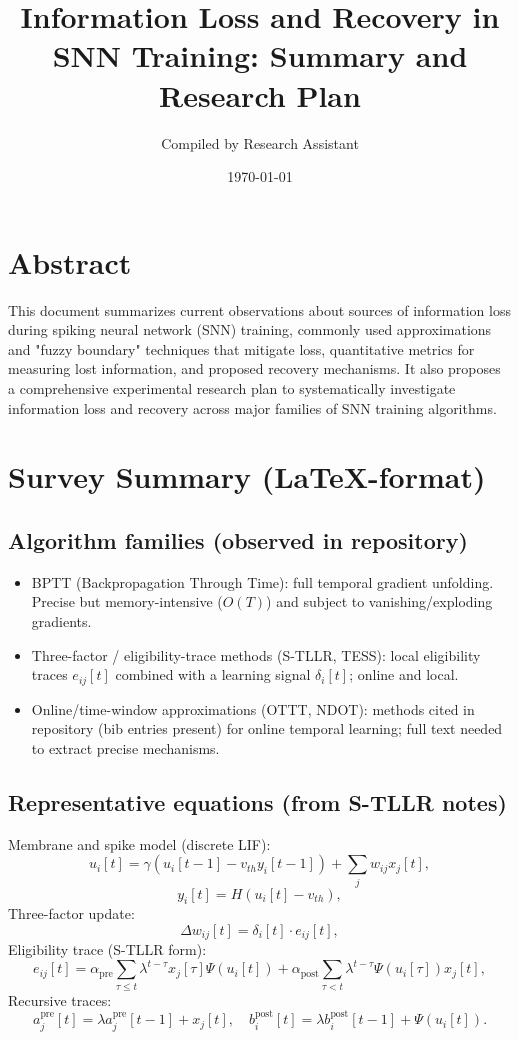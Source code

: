 \documentclass{article}
\begin{document}
\title{Information Loss and Recovery in SNN Training: Summary and Research Plan}
\author{Compiled by Research Assistant}
\date{\today}
\maketitle

\section*{Abstract}
This document summarizes current observations about sources of information loss during spiking neural network (SNN) training, commonly used approximations and "fuzzy boundary" techniques that mitigate loss, quantitative metrics for measuring lost information, and proposed recovery mechanisms. It also proposes a comprehensive experimental research plan to systematically investigate information loss and recovery across major families of SNN training algorithms.

\section{Survey Summary (LaTeX-format)}
\subsection{Algorithm families (observed in repository)}
\begin{itemize}
  \item BPTT (Backpropagation Through Time): full temporal gradient unfolding. Precise but memory-intensive ($O(T)$) and subject to vanishing/exploding gradients.
  \item Three-factor / eligibility-trace methods (S-TLLR, TESS): local eligibility traces $e_{ij}[t]$ combined with a learning signal $\delta_i[t]$; online and local.
  \item Online/time-window approximations (OTTT, NDOT): methods cited in repository (bib entries present) for online temporal learning; full text needed to extract precise mechanisms.
\end{itemize}

\subsection{Representative equations (from S-TLLR notes)}
Membrane and spike model (discrete LIF):
\[
u_i[t]=\gamma (u_i[t-1]-v_{th} y_i[t-1]) + \sum_j w_{ij} x_j[t],
\]
\[
y_i[t]=H(u_i[t]-v_{th}),
\]
Three-factor update:
\[
\Delta w_{ij}[t]=\delta_i[t]\cdot e_{ij}[t],
\]
Eligibility trace (S-TLLR form):
\[
e_{ij}[t]=\alpha_{\mathrm{pre}}\sum_{\tau\le t}\lambda^{t-\tau} x_j[\tau]\Psi(u_i[t]) + \alpha_{\mathrm{post}}\sum_{\tau<t}\lambda^{t-\tau}\Psi(u_i[\tau]) x_j[t],
\]
Recursive traces:
\[
a^{\mathrm{pre}}_j[t]=\lambda a^{\mathrm{pre}}_j[t-1]+x_j[t],\quad b^{\mathrm{post}}_i[t]=\lambda b^{\mathrm{post}}_i[t-1]+\Psi(u_i[t]).
\]
\end{document}
